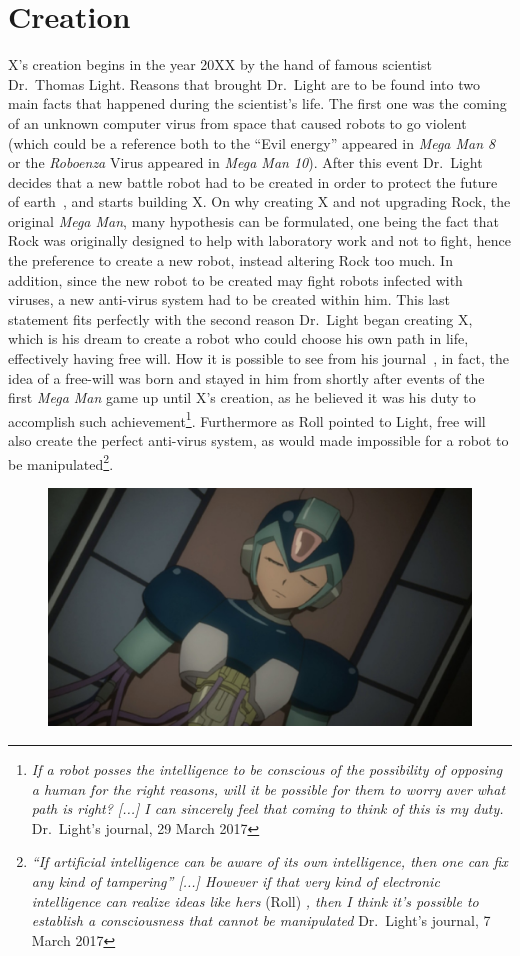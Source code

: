 \section{Creation}
X's creation begins in the year 20XX by the hand of famous scientist Dr.~Thomas Light. Reasons that brought Dr.~Light are to be found into two main facts that happened during the scientist's life. The first one was the coming of an unknown computer virus from space that caused robots to go violent (which could be a reference both to the ``Evil energy'' appeared in \emph{Mega Man 8} or the \textit{Roboenza} Virus appeared in \emph{Mega Man 10}). After this event Dr.~Light decides that a new battle robot had to be created in order to protect the future of earth~\cite{mega_man_network:Zero_timeline}, and starts building X. On why creating X and not upgrading Rock, the original \textit{Mega Man}, many hypothesis can be formulated, one being the fact that Rock was originally designed to help with laboratory work and not to fight, hence the preference to create a new robot, instead altering Rock too much. In addition, since the new robot to be created may fight robots infected with viruses, a new anti-virus system had to be created within him. This last statement fits perfectly with the second reason Dr.~Light began creating X, which is his dream to create a robot who could choose his own path in life, effectively having free will. How it is possible to see from his journal~\cite{Dr.Light_journal}, in fact, the idea of a free-will was born and stayed in him from shortly after events of the first \textit{Mega Man} game up until X's creation, as he believed it was his duty to accomplish such achievement\footnote{\textit{If a robot posses the intelligence to be conscious of the possibility of opposing a human for the right reasons, will it be possible for them to worry aver what path is right? [...] I can sincerely feel that coming to think of this is my duty.} Dr.~Light's journal, 29 March 2017}. Furthermore as Roll pointed to Light, free will also create the perfect anti-virus system, as would made impossible for a robot to be manipulated\footnote{\textit{``If artificial intelligence can be aware of its own intelligence, then one can fix any kind of tampering'' [...] However if that very kind of electronic intelligence can realize ideas like hers} (Roll) \textit{, then I think it's possible to establish a consciousness that cannot be manipulated} Dr.~Light's journal, 7 March 2017}. 
\begin{figure}[htp]
	\centering
	\includegraphics[width=0.7\linewidth]{figures/Characters/Char_X_build.jpg}
\end{figure}
